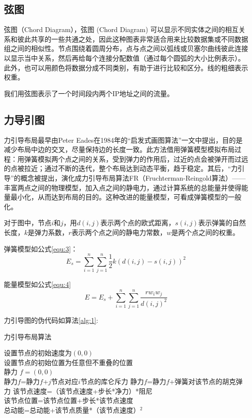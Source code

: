 \documentclass[journal]{vgtc}                %
\begin{document}
\subsection{弦图}
弦图（Chord Diagram），弦图 (Chord Diagram) 可以显示不同实体之间的相互关系和彼此共享的一些共通之处，因此这种图表非常适合用来比较数据集或不同数据组之间的相似性。节点围绕着圆周分布，点与点之间以弧线或贝塞尔曲线彼此连接以显示当中关系，然后再给每个连接分配数值（通过每个圆弧的大小比例表示）。此外，也可以用颜色将数据分成不同类别，有助于进行比较和区分。线的粗细表示权重。

我们用弦图表示了一个时间段内两个IP地址之间的流量。

\subsection{力导引图}
力引导布局最早由Peter Eades在1984年的“启发式画图算法”一文中提出，目的是减少布局中边的交叉，尽量保持边的长度一致。此方法借用弹簧模型模拟布局过程：用弹簧模拟两个点之间的关系，受到弹力的作用后，过近的点会被弹开而过远的点被拉近；通过不断的迭代，整个布局达到动态平衡，趋于稳定。其后，“力引导”的概念被提出，演化成力引导布局算法FR（Fruchterman-Reingold算法）——丰富两点之间的物理模型，加入点之间的静电力，通过计算系统的总能量并使得能量最小化，从而达到布局的目的。这种改进的能量模型，可看成弹簧模型的一般化。

对于图中，节点$i$和$j$，用$d(i,j)$表示两个点的欧式距离，$s(i,j)$表示弹簧的自然长度，$k$是弹力系数，$r$表示两个点之间的静电力常数，$w$是两个点之间的权重。

弹簧模型如公式\ref{equ:3}：
\begin{equation}
\label{equ:3}
E_s = \sum_{i=1}^{n}\sum_{j=1}^{n}\frac{1}{2}k(d(i,j)-s(i,j))^2
\end{equation}

能量模型如公式\ref{equ:4}
\begin{equation}
\label{equ:4}
E=E_s+\sum_{i=1}^{n}\sum_{j=1}^{n}\frac{rw_iw_j}{d(i,j)^2}
\end{equation}

力引导图的伪代码如算法\ref{alg:1}:

\begin{algorithm}
	\BlankLine
	\caption{力引导布局算法}\label{alg:1}
	\BlankLine
	设置节点的初始速度为$(0,0)$\\
	设置节点的初始位置为任意但不重叠的位置\\
	
	{
		静力 $f=(0,0)$\\
		{
			静力$f$=静力$f$+$j$节点对应$i$节点的库仑斥力
		}
		{
			静力$f$=静力$f$+弹簧对该节点的胡克弹力
		}
		该节点速度=（该节点速度+步长*净力）*阻尼\\
		该节点位置=该节点位置+步长*该节点速度\\
		总动能=总动能+该节点质量*（该节点速度）$^2$
	}

	
\end{algorithm}
\end{document}
